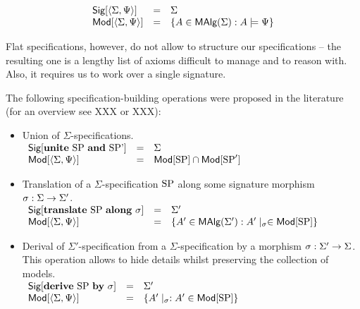 \[
\begin{array}{lcl}
   \mbox{\sf Sig}[\langle\Sigma,\Psi\rangle] & = & \Sigma \\
   \mbox{\sf Mod}[\langle\Sigma,\Psi\rangle] & = & \{ A \in \mbox{\rm\sf MAlg}(\Sigma): 
                                     A \models \Psi\}
\end{array}
\]

Flat specifications, however, do not allow to structure our
specifications -- the resulting one is a lengthy list of axioms
difficult to manage and to reason with. Also, it requires us to work
over a single signature.

The following specification-building operations were proposed in the
literature (for an overview see XXX or XXX):

\begin{itemize}
\item Union of $\Sigma$-specifications. \\
$
\begin{array}{lcl}
   \mbox{\sf Sig}[{\rm \bf unite}\ \mbox{\mbox{\rm SP}}\ {\rm \bf and}\ \mbox{\mbox{\rm SP}'}] & = & \Sigma \\
   \mbox{\sf Mod}[\langle\Sigma,\Psi\rangle] & = & \mbox{\sf Mod}[\mbox{\rm SP}] \cap \mbox{\sf Mod}[\mbox{\rm SP}']
\end{array}
$

\item Translation of a $\Sigma$-specification $\mbox{\rm SP}$ along some
signature morphism $\sigma : \Sigma \rightarrow \Sigma'$. \\ 
$
\begin{array}{lcl}
   \mbox{\sf Sig}[{\rm \bf translate}\ \mbox{\mbox{\rm SP}}\ {\rm \bf along}\ \sigma] & = & \Sigma' \\
   \mbox{\sf Mod}[\langle\Sigma,\Psi\rangle] & = & \{ A' \in \mbox{\rm\sf MAlg}(\Sigma'): 
                                     A'\mid_\sigma \in \mbox{\sf Mod}[\mbox{\rm SP}]\}
\end{array}
$

\item Derival of $\Sigma'$-specification from a $\Sigma$-specification
by a morphism $\sigma : \Sigma' \rightarrow \Sigma$. This operation allows to
hide details whilst preserving the collection of models. \\
$
\begin{array}{lcl}
   \mbox{\sf Sig}[{\rm \bf derive}\ \mbox{\mbox{\rm SP}}\ {\rm \bf by}\ \sigma] & = & \Sigma' \\
   \mbox{\sf Mod}[\langle\Sigma,\Psi\rangle] & = & \{ A'\mid_\sigma: 
                                     A' \in \mbox{\sf Mod}[\mbox{\rm SP}]\}
\end{array}
$
\end{itemize}




%
